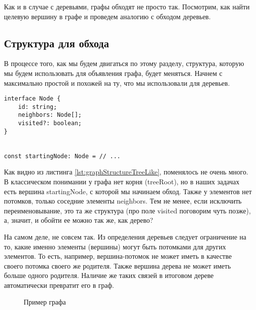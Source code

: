 \documentclass[../../article.tex]{subfiles}
\begin{document}

{Как и в случае с деревьями, графы обходят не просто так. Посмотрим, как найти целевую вершину в графе и проведем аналогию с обходом деревьев.}

\subsection{Структура для обхода}

В процессе того, как мы будем двигаться по этому разделу, структура, которую мы будем использовать для объявления графа, будет меняться. Начнем с максимально простой и похожей на ту, что мы использовали для деревьев.

\begin{ruledelement}
    \begin{lstlisting}[caption={Структура вершины графа}, label={lst:graphStructureTreeLike}]
interface Node {
    id: string;
    neighbors: Node[];
    visited?: boolean;
}


const startingNode: Node = // ...
    \end{lstlisting}
\end{ruledelement}

Как видно из листинга \ref{lst:graphStructureTreeLike}, поменялось не очень много. В классическом понимании у графа нет корня ({\firacodebold treeRoot}), но в наших задачах есть вершина {\firacodebold startingNode}, с которой мы начинаем обход. Также у элементов нет потомков, только соседние элементы {\firacodebold neighbors}. Тем не менее, если исключить переименовывание, это та же структура (про поле {\firacodebold visited} поговорим чуть позже), а, значит, и обойти ее можно так же, как дерево?

На самом деле, не совсем так. Из определения деревьев следует ограничение на то, какие именно элементы (вершины) могут быть потомками для других элементов. То есть, например, вершина-потомок не может иметь в качестве своего потомка своего же родителя. Также вершина дерева не может иметь больше одного родителя. Наличие же таких связей в итоговом дереве автоматически превратит его в граф.

\begin{figure}
    \caption{Пример графа}
    \label{fig:treeTurningToGraph}
\end{figure}
\end{document}
